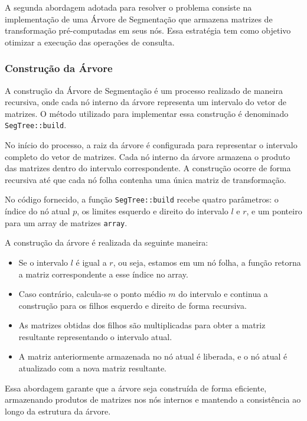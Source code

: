 \documentclass{article}
\begin{document}
A segunda abordagem adotada para resolver o problema consiste na implementação de uma Árvore de Segmentação que armazena matrizes de transformação pré-computadas em seus nós. Essa estratégia tem como objetivo otimizar a execução das operações de consulta.

\subsubsection{Construção da Árvore}

A construção da Árvore de Segmentação é um processo realizado de maneira recursiva, onde cada nó interno da árvore representa um intervalo do vetor de matrizes. O método utilizado para implementar essa construção é denominado \texttt{SegTree::build}.

No início do processo, a raiz da árvore é configurada para representar o intervalo completo do vetor de matrizes. Cada nó interno da árvore armazena o produto das matrizes dentro do intervalo correspondente. A construção ocorre de forma recursiva até que cada nó folha contenha uma única matriz de transformação.

No código fornecido, a função \texttt{SegTree::build} recebe quatro parâmetros: o índice do nó atual $p$, os limites esquerdo e direito do intervalo $l$ e $r$, e um ponteiro para um array de matrizes \texttt{array}.

A construção da árvore é realizada da seguinte maneira:

\begin{itemize}
    \item Se o intervalo $l$ é igual a $r$, ou seja, estamos em um nó folha, a função retorna a matriz correspondente a esse índice no array.
    \item Caso contrário, calcula-se o ponto médio $m$ do intervalo e continua a construção para os filhos esquerdo e direito de forma recursiva.
    \item As matrizes obtidas dos filhos são multiplicadas para obter a matriz resultante representando o intervalo atual.
    \item A matriz anteriormente armazenada no nó atual é liberada, e o nó atual é atualizado com a nova matriz resultante.
\end{itemize}

Essa abordagem garante que a árvore seja construída de forma eficiente, armazenando produtos de matrizes nos nós internos e mantendo a consistência ao longo da estrutura da árvore.
\end{document}
